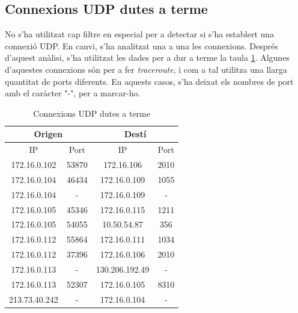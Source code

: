 \documentclass{article}
\begin{document}
\subsection{Connexions UDP dutes a terme}
No s'ha utilitzat cap filtre en especial per a detectar si s'ha establert
una connexió UDP. En canvi, s'ha analitzat una a una les connexions. Després
d'aquest anàlisi, s'ha utilitzat les dades per a dur a terme la taula \ref{udp:done}.
Algunes d'aquestes connexions són per a fer \textit{traceroute}, i com a tal
utilitza una llarga quantitat de ports diferents. En aquests casos, s'ha deixat
els nombres de port amb el caràcter "-", per a marcar-ho.
\begin{table}[!h]
\centering
\begin{tabular}{|c|c|c|c|}
\hline
\multicolumn{2}{|c|}{Origen} & \multicolumn{2}{c|}{Destí}\\
\hline
IP &Port &IP &Port\\
\hline
172.16.0.102 &53870 &172.16.106 &2010\\
\hline
172.16.0.104 &46434 &172.16.0.109 &1055\\
\hline
172.16.0.104 &- &172.16.0.109 &-\\
\hline
172.16.0.105 &45346 &172.16.0.115 &1211\\
\hline
172.16.0.105 &54055 &10.50.54.87 &356\\
\hline
172.16.0.112 &55864 &172.16.0.111 &1034\\
\hline
172.16.0.112 &37396 &172.16.0.106 &2010\\
\hline
172.16.0.113 &- &130.206.192.49 &-\\
\hline
172.16.0.113 &52307 &172.16.0.105 &8310\\
\hline
213.73.40.242 &- &172.16.0.104 &-\\
\hline
\end{tabular}
\caption{Connexions UDP dutes a terme}
\label{udp:done}
\end{table}
\end{document}
